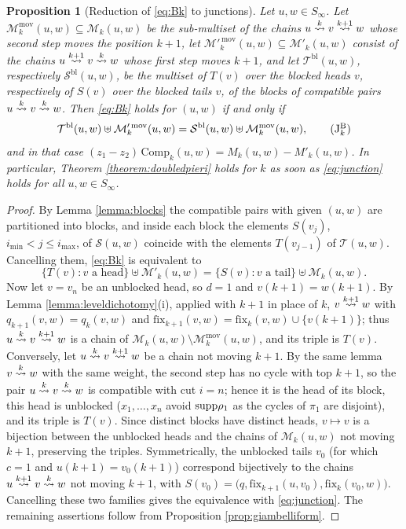 \documentclass{amsart}
\newtheorem{proposition}[lemma]{Proposition}
\theoremstyle{definition}
\theoremstyle{remark}
\numberwithin{equation}{section}
\newcommand{\xrightsquigarrow}[2][]{%
	\mathrel{\mathop{\rightsquigarrow}\limits^{\scriptstyle #2}%
	\ifx\hfuzz#1\hfuzz\else_{\scriptstyle #1}\fi}%
}
\newcommand{\tom}[1]{\ensuremath{\xrightsquigarrow{#1}}}
\newcommand{\fx}{\mathrm{fix}}
\begin{document}
\begin{proposition}[Reduction of \eqref{eq:Bk} to junctions] \label{prop:junction}
Let $u,w\in S_\infty$. Let $\mathcal M_k^{\mathrm{mov}}(u,w)\subseteq\mathcal M_k(u,w)$ be the sub-multiset of the chains $u\tom{k}v\tom{k+1}w$ whose second step moves the position $k+1$, let $\mathcal M'^{\,\mathrm{mov}}_k(u,w)\subseteq\mathcal M'_k(u,w)$ consist of the chains $u\tom{k+1}v\tom{k}w$ whose first step moves $k+1$, and let $\mathcal T^{\mathrm{bl}}(u,w)$, respectively $\mathcal S^{\mathrm{bl}}(u,w)$, be the multiset of $T(v)$ over the blocked heads $v$, respectively of $S(v)$ over the blocked tails $v$, of the blocks of compatible pairs $u\tom{k}v\tom{k}w$. Then \eqref{eq:Bk} holds for $(u,w)$ if and only if
\begin{equation}\label{eq:junction}
\mathcal T^{\mathrm{bl}}(u,w)\uplus\mathcal M'^{\,\mathrm{mov}}_k(u,w)=\mathcal S^{\mathrm{bl}}(u,w)\uplus\mathcal M^{\mathrm{mov}}_k(u,w),\tag{$\mathrm J^{\mathrm B}_k$}
\end{equation}
and in that case $(z_1-z_2)\,\mathrm{Comp}_k(u,w)=M_k(u,w)-M'_k(u,w)$. In particular, Theorem \ref{theorem:doubledpieri} holds for $k$ as soon as \eqref{eq:junction} holds for all $u,w\in S_\infty$.
\end{proposition}
\begin{proof}
By Lemma \ref{lemma:blocks} the compatible pairs with given $(u,w)$ are partitioned into blocks, and inside each block the elements $S(v_j)$, $i_{\min}<j\leq i_{\max}$, of $\mathcal S(u,w)$ coincide with the elements $T(v_{j-1})$ of $\mathcal T(u,w)$. Cancelling them, \eqref{eq:Bk} is equivalent to
$$\{T(v):v\text{ a head}\}\uplus\mathcal M'_k(u,w)=\{S(v):v\text{ a tail}\}\uplus\mathcal M_k(u,w).$$
Now let $v=v_n$ be an unblocked head, so $d=1$ and $v(k+1)=w(k+1)$. By Lemma \ref{lemma:leveldichotomy}(i), applied with $k+1$ in place of $k$, $v\tom{k+1}w$ with $q_{k+1}(v,w)=q_k(v,w)$ and $\fx_{k+1}(v,w)=\fx_k(v,w)\cup\{v(k+1)\}$; thus $u\tom{k}v\tom{k+1}w$ is a chain of $\mathcal M_k(u,w)\setminus\mathcal M_k^{\mathrm{mov}}(u,w)$, and its triple is $T(v)$. Conversely, let $u\tom{k}v\tom{k+1}w$ be a chain not moving $k+1$. By the same lemma $v\tom{k}w$ with the same weight, the second step has no cycle with top $k+1$, so the pair $u\tom{k}v\tom{k}w$ is compatible with cut $i=n$; hence it is the head of its block, this head is unblocked ($x_1,\ldots,x_n$ avoid $\mathrm{supp}\rho_1$ as the cycles of $\pi_1$ are disjoint), and its triple is $T(v)$. Since distinct blocks have distinct heads, $v\mapsto v$ is a bijection between the unblocked heads and the chains of $\mathcal M_k(u,w)$ not moving $k+1$, preserving the triples. Symmetrically, the unblocked tails $v_0$ (for which $c=1$ and $u(k+1)=v_0(k+1)$) correspond bijectively to the chains $u\tom{k+1}v\tom{k}w$ not moving $k+1$, with $S(v_0)=\big(q,\fx_{k+1}(u,v_0),\fx_k(v_0,w)\big)$. Cancelling these two families gives the equivalence with \eqref{eq:junction}. The remaining assertions follow from Proposition \ref{prop:giambelliform}.
\end{proof}
\end{document}
